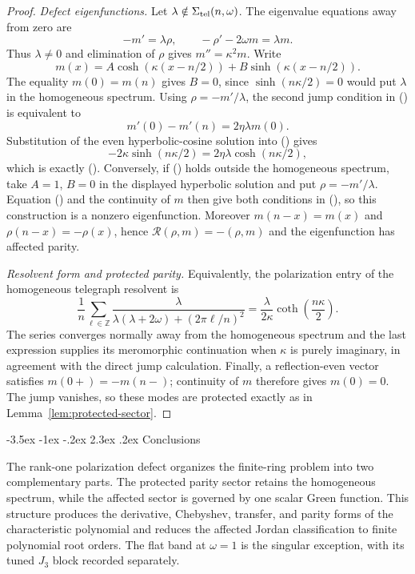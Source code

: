 \documentclass[twoside,10pt]{article}
\makeatletter
\numberwithin{equation}{section}
\theoremstyle{slbody}
\theoremstyle{definition}
\theoremstyle{remark}
\newcommand{\Z}{\mathbb Z}
\renewcommand{\section}{%
  \@startsection{section}{1}{\z@}%
    {-3.5ex \@plus -1ex \@minus -.2ex}%
    {2.3ex \@plus .2ex}%
    {\normalfont\large\bfseries}}
\renewcommand{\eqref}[1]{%
  \textup{{\normalfont(\oldstylenums{\ref{#1}}}\normalfont)}}
\makeatother
\begin{document}
\begin{proof}
\smallskip
\noindent\emph{Defect eigenfunctions.}
Let $\lambda\notin\Sigma_{\rm tel}(n,\omega)$.  The
eigenvalue equations away from zero are
\[
 -m'=\lambda\rho,\qquad -\rho'-2\omega m=\lambda m.
\]
Thus $\lambda\ne0$ and elimination of $\rho$ gives
$m''=\kappa^2m$.  Write
\[
 m(x)=A\cosh\!\left(\kappa(x-n/2)\right)
      +B\sinh\!\left(\kappa(x-n/2)\right).
\]
The equality $m(0)=m(n)$ gives $B=0$, since
$\sinh(n\kappa/2)=0$ would put $\lambda$ in the homogeneous spectrum.
Using $\rho=-m'/\lambda$, the second jump condition in
\eqref{eq:telegraph-jump-domain} is equivalent to
\begin{equation}\label{eq:telegraph-derivative-jump}
 m'(0)-m'(n)=2\eta\lambda m(0).
\end{equation}
Substitution of the even hyperbolic-cosine solution into
\eqref{eq:telegraph-derivative-jump} gives
\[
 -2\kappa\sinh(n\kappa/2)
 =2\eta\lambda\cosh(n\kappa/2),
\]
which is exactly \eqref{eq:telegraph-defect}.
Conversely, if \eqref{eq:telegraph-defect} holds outside the homogeneous
spectrum, take $A=1$, $B=0$ in the displayed hyperbolic solution and
put $\rho=-m'/\lambda$.  Equation
\eqref{eq:telegraph-derivative-jump} and the continuity of $m$ then give
both conditions in \eqref{eq:telegraph-jump-domain}, so this construction
is a nonzero eigenfunction.  Moreover
$m(n-x)=m(x)$ and $\rho(n-x)=-\rho(x)$, hence
$\mathcal R(\rho,m)=-(\rho,m)$ and the eigenfunction has affected parity.

\smallskip
\noindent\emph{Resolvent form and protected parity.}
Equivalently, the polarization entry of the homogeneous telegraph
resolvent is
\[
 \frac1n\sum_{\ell\in\Z}
 \frac{\lambda}{\lambda(\lambda+2\omega)+(2\pi\ell/n)^2}
 =\frac{\lambda}{2\kappa}\coth\left(\frac{n\kappa}{2}\right).
\]
The series converges normally away from the homogeneous spectrum and
the last expression supplies its meromorphic continuation when
$\kappa$ is purely imaginary, in agreement with the direct jump
calculation.  Finally, a reflection-even vector satisfies
$m(0+)=-m(n-)$; continuity of $m$ therefore gives $m(0)=0$.  The jump
vanishes, so these modes are protected exactly as in
Lemma~\ref{lem:protected-sector}.
\end{proof}

\section{Conclusions}\label{sec:conclusions}

The rank-one polarization defect organizes the finite-ring problem into
two complementary parts.  The protected parity sector retains the
homogeneous spectrum, while the affected sector is governed by one
scalar Green function.  This structure produces the derivative,
Chebyshev, transfer, and parity forms of the characteristic polynomial
and reduces the affected Jordan classification to finite polynomial
root orders.  The flat band at $\omega=1$ is the singular exception, with
its tuned $J_3$ block recorded separately.
\end{document}

